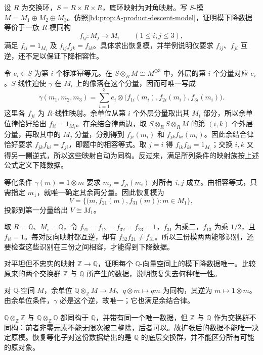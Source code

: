 \begin{exercise}\label{b4:ex:A-product-descent}
	设 \(R\) 为交换环，\(S=R\times R\times R\)，底环映射为对角映射。写 \(S\)-模 \(M=M_1\oplus M_2\oplus M_3\)。仿照\cref{b4:prop:A-product-descent-model}，证明模下降数据等价于一族 \(R\)-模同构
	\[
		f_{ij}:M_j\longrightarrow M_i\qquad(1\le i,j\le3),
	\]
	满足 \(f_{ii}=1_{M_i}\) 及 \(f_{ij}f_{jk}=f_{ik}\)。具体求出恢复模，并举例说明仅要求 \(f_{ij}\)、\(f_{ji}\) 互逆，还不足以保证下降相容性。
\end{exercise}
\begin{solution}
	令 \(e_i\in S\) 为第 \(i\) 个标准幂等元。在 \(S\otimes_RM\cong M^{\oplus3}\) 中，外层的第 \(i\) 个分量对应 \(e_i\)。\(S\)-线性迫使 \(\gamma\) 在 \(M_i\) 上的像落在这个分量，因而可唯一写成
	\[
		\gamma(m_1,m_2,m_3) =\sum_{i=1}^3 e_i\otimes \bigl(f_{1i}(m_i),f_{2i}(m_i),f_{3i}(m_i)\bigr).
	\]
	这里各 \(f_{ji}\) 为 \(R\)-线性映射。余单位从第 \(i\) 个外层分量取出其 \(M_i\) 部分，所以余单位律恰好给出 \(f_{ii}=1_{M_i}\)。在余结合律两边，取 \(S\otimes_RS\otimes_RM\) 的第 \((i,k)\) 个外层分量，再取其中的 \(M_j\) 分量，分别得到 \(f_{ji}(m_i)\) 和 \(f_{jk}f_{ki}(m_i)\)。因此余结合律恰好要求 \(f_{jk}f_{ki}=f_{ji}\)，即题中的相容等式。取 \(j=i\) 得 \(f_{ik}f_{ki}=1_{M_i}\)；交换 \(i,k\) 又得另一侧逆式，所以这些映射自动为同构。反过来，满足所列条件的映射族按上述公式定义下降数据。

	等化条件 \(\gamma(m)=1\otimes m\) 要求 \(m_j=f_{ji}(m_i)\) 对所有 \(i,j\) 成立。由相容等式，只需指定 \(m_1\)，就唯一确定其余两分量。因此恢复模为
	\[
		V=\bigl\{\bigl(m,f_{21}(m),f_{31}(m)\bigr):m\in M_1\bigr\},
	\]
	投影到第一分量给出 \(V\cong M_1\)。

	取 \(R=\mathbb Q\)、\(M_i=\mathbb Q\)，令 \(f_{21}=f_{12}=f_{32}=f_{23}=1\)，\(f_{31}\) 为乘二，\(f_{13}\) 为乘 \(1/2\)，且 \(f_{ii}=1\)。每对反向映射都互逆，却有 \(f_{32}f_{21}\ne f_{31}\)。所以三份模两两能够识别，还要检查这些识别在三份之间相容，才能得到下降数据。
\end{solution}

\begin{exercise}\label{b4:ex:A-rational-descent-loss}
	对平坦但不忠实的映射 \(\mathbb Z\to\mathbb Q\)，证明每个 \(\mathbb Q\)-向量空间上的模下降数据唯一。比较原来的两个交换群 \(\mathbb Z\) 与 \(\mathbb Q\) 所产生的数据，说明恢复失去何种唯一性。
\end{exercise}
\begin{solution}
	对 \(\mathbb Q\)-空间 \(M\)，余单位 \(\mathbb Q\otimes_{\mathbb Z}M\to M\)、\(q\otimes m\mapsto qm\) 为同构，其逆为 \(m\mapsto1\otimes m\)。由余单位条件，\(\gamma\) 必是这个逆，故唯一；它也满足余结合律。

	\(\mathbb Q\otimes_{\mathbb Z}\mathbb Z\) 与 \(\mathbb Q\otimes_{\mathbb Z}\mathbb Q\) 都同构于 \(\mathbb Q\)，并带有同一个唯一数据，但 \(\mathbb Z\) 与 \(\mathbb Q\) 作为交换群不同构：前者非零元素不能无限次被二整除，后者可以。故扩张后的数据不能唯一决定原模。恢复等化子对这份数据给出的是 \(\mathbb Q\) 的底层交换群，并不能区分所有可能的原对象。
\end{solution}

